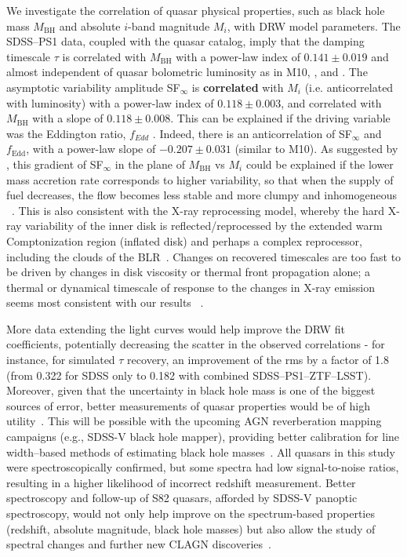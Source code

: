 \documentclass[twocolumn]{aastex62}
\begin{document}
We investigate the correlation of quasar physical properties, such as black hole mass $M_{\mathrm{BH}}$ and absolute $i$-band magnitude $M_{i}$,  with DRW model parameters. The SDSS--PS1 data, coupled with the \citet{shen2011} quasar catalog, imply that the damping timescale $\tau$  is correlated with $M_{\mathrm{BH}}$ with a power-law index of $0.141 \pm 0.019$ and almost independent of quasar bolometric luminosity as in M10, \citet{wilhite2008}, and \citet{vandenberk2004}. The asymptotic variability amplitude SF$_{\infty}$ is \textbf{correlated} with $M_{i}$ (i.e. anticorrelated with luminosity) with a power-law index of $0.118 \pm 0.003$, and correlated with $M_{\mathrm{BH}}$ with a slope of $0.118\pm 0.008$. This can be explained if the driving variable was the Eddington ratio, $f_{Edd}$ \citep{wilhite2008}. Indeed, there is an anticorrelation of SF$_{\infty}$ and $f_{\mathrm{Edd}}$, with a power-law slope of $-0.207 \pm 0.031$ (similar to M10).  As suggested by \citet{kubota2018}, this gradient of SF$_{\infty}$ in the plane of $M_{\mathrm{BH}}$ vs $M_{i}$ could be explained if the lower mass accretion rate corresponds to higher variability, so that when the supply of fuel decreases, the flow becomes less stable and more clumpy and inhomogeneous ~\citep{rakshit2017, kokubo2015, dexter2011}.  This is also consistent with the X-ray reprocessing model, whereby the hard X-ray variability of the inner disk is reflected/reprocessed by the extended warm Comptonization region (inflated disk) and perhaps a complex reprocessor, including the clouds of the BLR~\citep{kubota2018, panda2019b}. Changes on recovered timescales are too fast to be driven by changes in disk viscosity or thermal front propagation alone; a thermal or dynamical timescale of response to the changes in X-ray emission seems most consistent with our results ~\citep{stern2018}.


More data extending the light curves would help improve the DRW fit coefficients, potentially decreasing the scatter in the observed correlations - for instance, for simulated $\tau$ recovery, an improvement of the rms by a factor of 1.8 (from 0.322 for SDSS only to 0.182 with combined SDSS--PS1--ZTF--LSST). Moreover, given that the uncertainty in black hole mass is one of the biggest sources of error, better measurements of quasar properties would be of high utility~\citep{shen2011}.  This will be possible with the upcoming AGN reverberation mapping campaigns (e.g., SDSS-V black hole mapper), providing better calibration for line width--based methods of estimating black hole masses~\citep{kollmeier2017}. All quasars in this study were spectroscopically confirmed, but some spectra had low signal-to-noise ratios, resulting in a higher likelihood of incorrect redshift measurement. Better spectroscopy and follow-up of S82 quasars, afforded by SDSS-V panoptic spectroscopy, would not only help improve on the spectrum-based  properties (redshift, absolute magnitude, black hole masses) but also allow the study of spectral changes and further new CLAGN discoveries~\citep{macleod2019}. 
\end{document}
